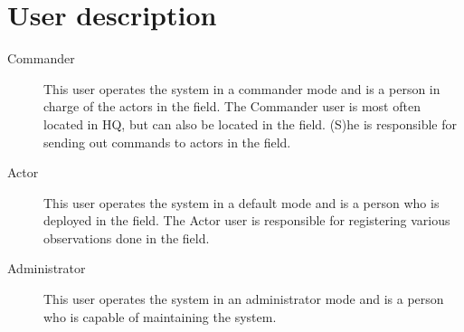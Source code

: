 \section{User description}

\begin{description}
  \item[Commander] This user operates the system in a commander mode and is a person in charge of the actors in the field. The Commander user is most often located in HQ, but can also be located in the field. (S)he is responsible for sending out commands to actors in the field.
  \item[Actor] This user operates the system in a default mode and is a person who is deployed in the field. The Actor user is responsible for registering various observations done in the field.
  \item[Administrator] This user operates the system in an administrator mode and is a person who is capable of maintaining the system.
\end{description}
